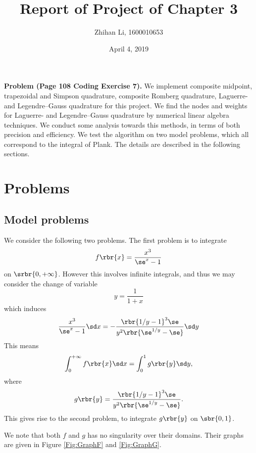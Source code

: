 \documentclass[english, nochinese]{pnote}
\title{Report of Project of Chapter 3}
\author{Zhihan Li, 1600010653}
\date{April 4, 2019}
\begin{document}
\maketitle

\textbf{Problem (Page 108 Coding Exercise 7).} We implement composite midpoint, trapezoidal and Simpson quadrature, composite Romberg quadrature, Laguerre- and Legendre--Gauss quadrature for this project. We find the nodes and weights for Laguerre- and Legendre--Gauss quadrature by numerical linear algebra techniques. We conduct some analysis towards this methods, in terms of both precision and efficiency. We test the algorithm on two model problems, which all correspond to the integral of Plank. The details are described in the following sections.

\section{Problems}

\subsection{Model problems}

We consider the following two problems. The first problem is to integrate
\begin{equation}
f \rbr{x} = \frac{x^3}{ \se^x - 1 }
\end{equation}
on $ \srbr{ 0, +\infty } $. However this involves infinite integrals, and thus we may consider the change of variable
\begin{equation}
y = \frac{1}{ 1 + x }
\end{equation}
which induces
\begin{equation}
\frac{x^3}{ \se^x - 1 } \sd x = - \frac{ \rbr{ 1 / y - 1 }^3 \se }{ y^2 \rbr{ \se^{ 1 / y } - \se } } \sd y
\end{equation}
This means
\begin{equation}
\int_0^{+\infty} f \rbr{x} \sd x = \int_0^1 g \rbr{y} \sd y,
\end{equation}
where
\begin{equation}
g \rbr{y} = \frac{ \rbr{ 1 / y - 1 }^3 \se }{ y^2 \rbr{ \se^{ 1 / y } - \se } }.
\end{equation}
This gives rise to the second problem, to integrate $ g \rbr{y} $ on $ \sbr{ 0, 1 } $.

We note that both $f$ and $g$ has no singularity over their domains. Their graphs are given in Figure \ref{Fig:GraphF} and \ref{Fig:GraphG}.
\end{document}
